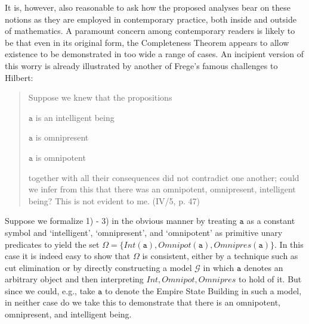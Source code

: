 \documentclass[11pt,fleqn,leqno]{article}
\begin{document}
It is, however, also reasonable to ask how the proposed analyses bear on these notions as they are employed in contemporary practice, both inside and outside of mathematics.   A paramount concern among contemporary readers is likely to be that even in its original form, the Completeness Theorem appears to allow existence to be demonstrated in too wide a range of cases.   An incipient version of this worry is already illustrated by another of Frege's famous challenges to Hilbert:
\begin{quote}
{\footnotesize Suppose we knew that the propositions
\begin{compactenum}[1)]
\item $\texttt{a}$ is an intelligent being 
\item $\texttt{a}$ is omnipresent
\item $\texttt{a}$ is omnipotent
\end{compactenum}
together with all their consequences did not contradict one another; could we infer from this that there was an omnipotent, omnipresent, intelligent being? This is not evident to me. \hfill (IV/5, p. 47)}
\end{quote}
Suppose we formalize 1) - 3) in the obvious manner by treating $\texttt{a}$ as a constant symbol and  `intelligent', `omnipresent', and `omnipotent' as primitive unary predicates to yield the set $\Omega = \{\mathit{Int}(\texttt{a}),\mathit{Omnipot}(\texttt{a}),\mathit{Omnipres}(\texttt{a})\}$.  In this case it is indeed easy to show that $\Omega$ is consistent, either by a technique such as cut elimination or by directly constructing a model $\mathcal{G}$ in which $\texttt{a}$ denotes an arbitrary object and then interpreting $\mathit{Int},\mathit{Omnipot},\mathit{Omnipres}$ to hold of it.   But since we could, e.g., take $\texttt{a}$ to denote the Empire State Building in such a model, in neither case do we take this to demonstrate that there is an omnipotent, omnipresent, and intelligent being.   
\end{document}
